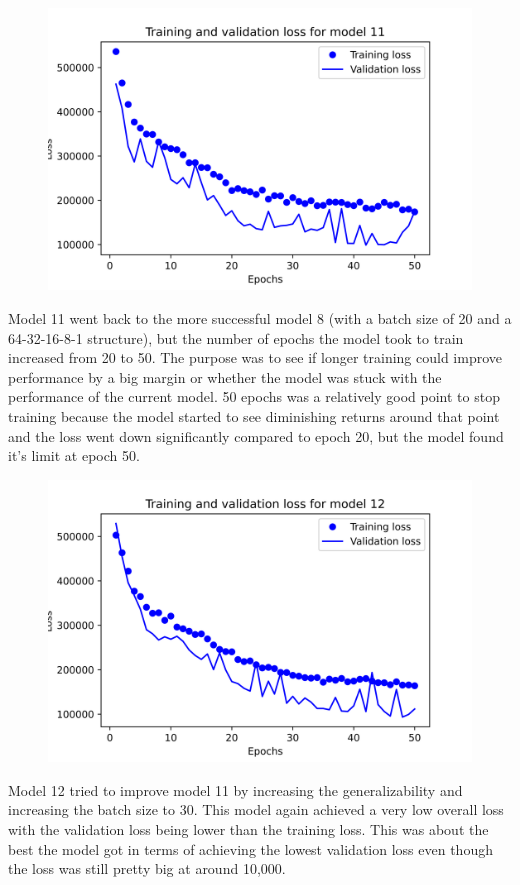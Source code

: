 \documentclass{article}
\begin{document}
    \begin{figure}[H]
        \includegraphics[width=\linewidth]{images/model11.png}
    \end{figure}
    Model 11 went back to the more successful model 8 (with a batch size of 20 and a 64-32-16-8-1 structure), but the 
    number of epochs the model took to train increased from 20 to 50. The purpose was to see if longer training 
    could improve performance by a big margin or whether the model was stuck with the performance of the current model. 
    50 epochs was a relatively good point to stop training because the model started to see diminishing returns around 
    that point and the loss went down significantly compared to epoch 20, but the model found it's limit at epoch 50.

    \begin{figure}[H]
        \includegraphics[width=\linewidth]{images/model12.png}
    \end{figure}
    Model 12 tried to improve model 11 by increasing the generalizability and increasing the batch size to 30. This model 
    again achieved a very low overall loss with the validation loss being lower than the training loss. This was about the 
    best the model got in terms of achieving the lowest validation loss even though the loss was still pretty big at around 10,000.
\end{document}
